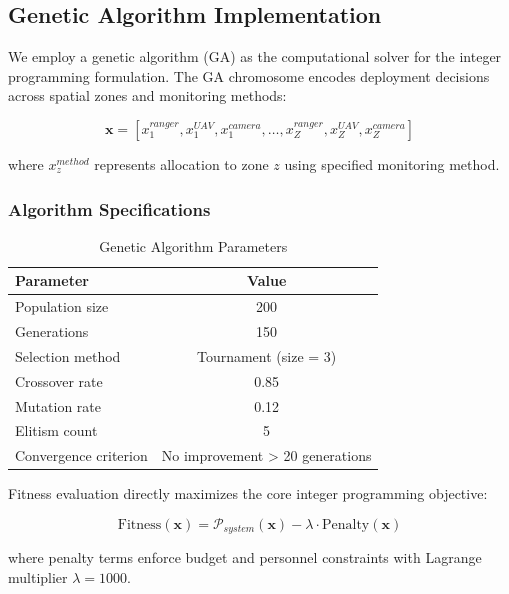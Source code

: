 \subsection{Genetic Algorithm Implementation}

We employ a genetic algorithm (GA) as the computational solver for the integer programming formulation. The GA chromosome encodes deployment decisions across spatial zones and monitoring methods:

\begin{equation}
\mathbf{x} = [x_{1}^{ranger}, x_{1}^{UAV}, x_{1}^{camera}, \ldots, x_{Z}^{ranger}, x_{Z}^{UAV}, x_{Z}^{camera}]
\label{eq:chromosome}
\end{equation}

where $x_{z}^{method}$ represents allocation to zone $z$ using specified monitoring method.

\subsubsection{Algorithm Specifications}

\begin{table}[h]
\centering
\caption{Genetic Algorithm Parameters}
\begin{tabular}{lc}
\hline
\textbf{Parameter} & \textbf{Value} \\
\hline
Population size & 200 \\
Generations & 150 \\
Selection method & Tournament (size = 3) \\
Crossover rate & 0.85 \\
Mutation rate & 0.12 \\
Elitism count & 5 \\
Convergence criterion & No improvement > 20 generations \\
\hline
\end{tabular}
\end{table}

Fitness evaluation directly maximizes the core integer programming objective:

\begin{equation}
\text{Fitness}(\mathbf{x}) = \mathcal{P}_{system}(\mathbf{x}) - \lambda \cdot \text{Penalty}(\mathbf{x})
\label{eq:fitness}
\end{equation}

where penalty terms enforce budget and personnel constraints with Lagrange multiplier $\lambda = 1000$.

